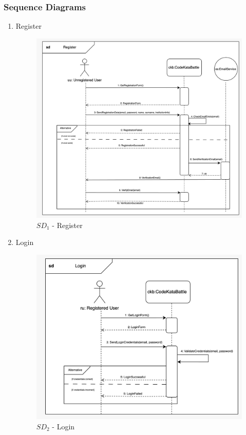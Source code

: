 \subsubsection{Sequence Diagrams}
\begin{enumerate}
    \item Register
    \begin{figure}[H]
        \centering
        \includegraphics[scale=0.2]{Images/sequence_diagrams/SD-register.jpeg}
        \caption{$SD_{1}$ - Register}
    \end{figure}


    \item Login
    \begin{figure}[H]
        \centering
        \includegraphics[scale=0.2]{Images/sequence_diagrams/SD-login.jpeg}
        \caption{$SD_{2}$ - Login}
    \end{figure}
    

\end{enumerate}
